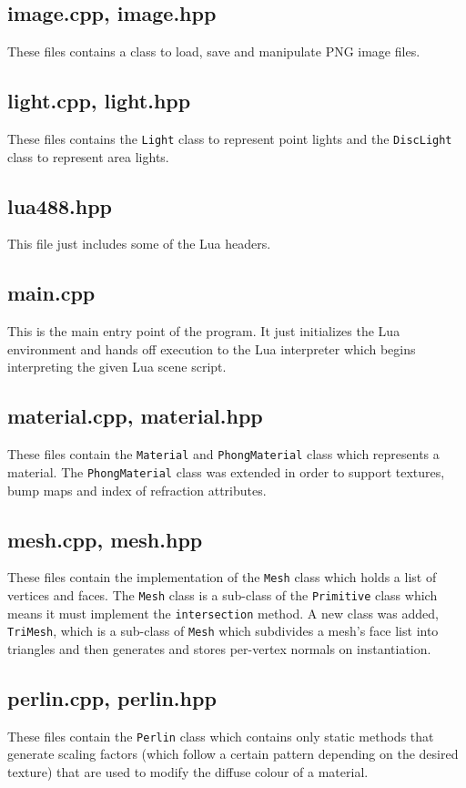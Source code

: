 \subsection*{image.cpp, image.hpp}
These files contains a class to load, save and manipulate PNG image files.

\subsection*{light.cpp, light.hpp}
These files contains the \verb|Light| class to represent point lights and the
\verb|DiscLight| class to represent area lights.

\subsection*{lua488.hpp}
This file just includes some of the Lua headers.

\subsection*{main.cpp}
This is the main entry point of the program. It just initializes the Lua
environment and hands off execution to the Lua interpreter which begins
interpreting the given Lua scene script.

\subsection*{material.cpp, material.hpp}
These files contain the \verb|Material| and \verb|PhongMaterial| class which
represents a material. The \verb|PhongMaterial| class was extended in order to
support textures, bump maps and index of refraction attributes.

\subsection*{mesh.cpp, mesh.hpp}
These files contain the implementation of the \verb|Mesh| class which holds a
list of vertices and faces. The \verb|Mesh| class is a sub-class of the
\verb|Primitive| class which means it must implement the \verb|intersection|
method. A new class was added, \verb|TriMesh|, which is a sub-class of 
\verb|Mesh| which subdivides a mesh's face list into triangles and then
generates and stores per-vertex normals on instantiation.

\subsection*{perlin.cpp, perlin.hpp}
These files contain the \verb|Perlin| class which contains only static methods
that generate scaling factors (which follow a certain pattern depending on the
desired texture) that are used to modify the diffuse colour of a material.

